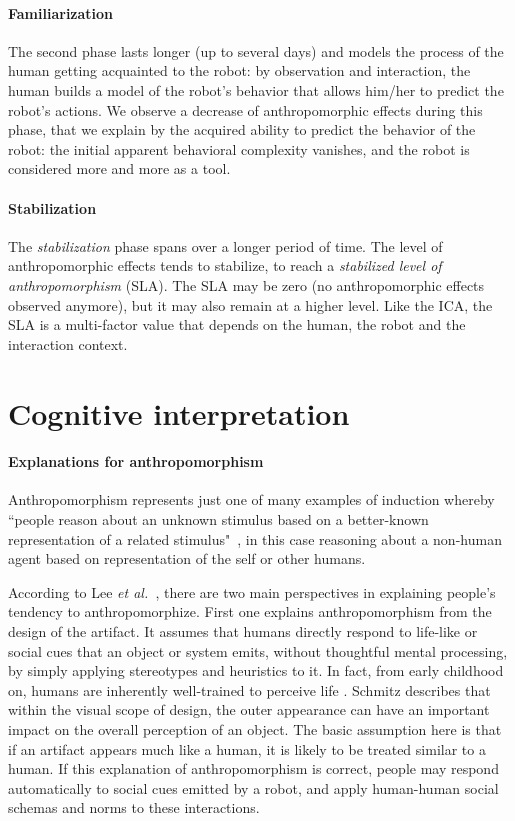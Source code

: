 \documentclass{sig-alternate-2013}
\newcommand{\etal}{{\textit{et al.~}}}
\begin{document}
\paragraph*{Familiarization} The second phase lasts longer (up to several days)
and models the process of the human getting acquainted to the robot: by
observation and interaction, the human builds a model of the robot's behavior
that allows him/her to predict the robot's actions. We observe a decrease of
anthropomorphic effects during this phase, that we explain by the acquired
ability to predict the behavior of the robot: the initial apparent behavioral
complexity vanishes, and the robot is considered more and more as a tool.

\paragraph*{Stabilization} The \emph{stabilization} phase spans over a longer
period of time. The level of anthropomorphic effects tends to stabilize, to
reach a \emph{stabilized level of anthropomorphism} (SLA). The SLA may be zero
(no anthropomorphic effects observed anymore), but it may also remain at a
higher level. Like the ICA, the SLA is a multi-factor value that depends on the
human, the robot and the interaction context.

\section{Cognitive interpretation}
\label{sec:cognitivemodel}

\paragraph*{Explanations for anthropomorphism}

Anthropomorphism represents just one of many examples of induction whereby
``people reason about an unknown stimulus based on a better-known representation
of a related stimulus"~\cite{epley_when_2008}, in this case reasoning about a
non-human agent based on representation of the self or other humans.

According to Lee \etal \cite{lee_human_2005}, there are two main perspectives in
explaining people's tendency to anthropomorphize. First one explains
anthropomorphism from the design of the artifact. It assumes that humans
directly respond to life-like or social cues that an object or system emits,
without thoughtful mental processing, by simply applying stereotypes and
heuristics to it. In fact, from early childhood on, humans are inherently
well-trained to perceive life \cite{epley_seeing_2007}. Schmitz
\cite{schmitz_concepts_2011} describes that within the visual scope of design,
the outer appearance can have an important impact on the overall perception of
an object. The basic assumption here is that if an artifact appears much like a
human, it is likely to be treated similar to a human. If this explanation of
anthropomorphism is correct, people may respond automatically to social cues
emitted by a robot, and apply human-human social schemas and norms to these
interactions.
\end{document}
